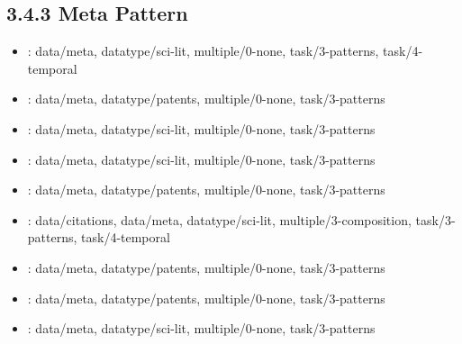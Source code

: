 \begin {refsection}
\section [3.4.3 Meta Pattern] {3.4.3 Meta Pattern}

\begin {itemize}
\item \cite {shneiderman-2000-visualizing-digital-library-search-results}:
    data/meta, datatype/sci-lit, multiple/0-none, task/3-patterns, task/4-temporal


\item \cite {wittenburg-2012-visualizing-set-valued-attributes-in-parallel-with}:
    data/meta, datatype/patents, multiple/0-none, task/3-patterns


\item \cite {perer-2011-visual-social-network-analytics-for-relationship}:
    data/meta, datatype/sci-lit, multiple/0-none, task/3-patterns


\item \cite {wong-2011-invisque:-technology-and-methodologies-for-interactive-information}:
    data/meta, datatype/sci-lit, multiple/0-none, task/3-patterns


\item \cite {boerner-2007-taxonomy-visualization-in-support-of-the-semi-automatic-validation}:
    data/meta, datatype/patents, multiple/0-none, task/3-patterns


\item \cite {zhao-2013-interactive-exploration-of-implicit-and-explicit-relations}:
    data/citations, data/meta, datatype/sci-lit, multiple/3-composition, task/3-patterns, task/4-temporal


\item \cite {giereth-2008-a-3d-treemap-approach-for-analyzing-the-classificatory-distribution}:
    data/meta, datatype/patents, multiple/0-none, task/3-patterns


\item \cite {wittenburg-2015-multi-dimensional-comparative-visualization-for-patent-landscaping}:
    data/meta, datatype/patents, multiple/0-none, task/3-patterns


\item \cite {sallaberry-2010-discovering-novelty-in-gene-data:-from}:
    data/meta, datatype/sci-lit, multiple/0-none, task/3-patterns


\end {itemize}
\printbibliography
\end {refsection}\pagebreak


